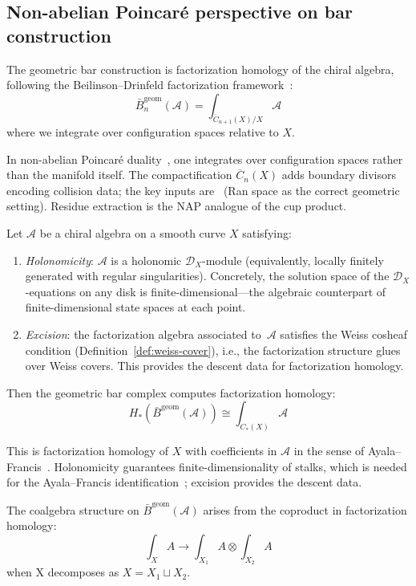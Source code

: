 \subsection{Non-abelian Poincaré perspective on bar construction}

\begin{definition}\label{def:bar-fh}
The geometric bar construction is factorization homology of the
chiral algebra, following the Beilinson--Drinfeld factorization
framework~\cite[\S3.4]{BD04}:
\[\bar{B}^{\text{geom}}_n(\mathcal{A}) = \int_{\overline{C}_{n+1}(X)/X} \mathcal{A}\]
where we integrate over configuration spaces relative to $X$.
\end{definition}

\begin{remark}\label{rem:why-config-NAP}
In non-abelian Poincar\'e duality~\cite[\S3.4]{BD04}, one integrates
over configuration spaces rather than the manifold itself.  The
compactification $\overline{C}_n(X)$ adds boundary divisors encoding
collision data; the key inputs are~\cite[Theorem~3.4.22, \S3.6]{BD04}
(Ran space as the correct geometric setting).  Residue extraction is
the NAP analogue of the cup product.
\end{remark}

\begin{theorem}\label{thm:bar-NAP-homology}\label{thm:bar-computes-chiral-homology}
Let $\mathcal{A}$ be a chiral algebra on a smooth curve $X$ satisfying:
\begin{enumerate}[label=\textup{(\roman*)}]
\item \emph{Holonomicity}: $\mathcal{A}$ is a holonomic
  $\mathcal{D}_X$-module (equivalently, locally finitely generated
  with regular singularities).  Concretely, the solution space of the
  $\mathcal{D}_X$-equations on any disk is finite-dimensional---the
  algebraic counterpart of finite-dimensional state spaces at each
  point.
\item \emph{Excision}: the factorization algebra associated
  to~$\mathcal{A}$ satisfies the Weiss cosheaf condition
  (Definition~\ref{def:weiss-cover}), i.e., the
  factorization structure glues over Weiss covers.  This
  provides the descent data for factorization homology.
\end{enumerate}
Then the geometric bar complex computes factorization homology:
\[H_*(\bar{B}^{\text{geom}}(\mathcal{A})) \cong \int_{C_*(X)} \mathcal{A}\]

This is factorization homology of $X$ with coefficients in $\mathcal{A}$ in the sense of Ayala--Francis~\cite{AF15}.  Holonomicity guarantees finite-dimensionality of stalks, which is needed for the Ayala--Francis identification~\cite[Theorem~5.1]{AF15}; excision provides the descent data.

The coalgebra structure on $\bar{B}^{\text{geom}}(\mathcal{A})$ arises from the coproduct in factorization homology:
\[\int_X A \to \int_{X_1} A \otimes \int_{X_2} A\]
when X decomposes as $X = X_1 \sqcup X_2$.
\end{theorem}

